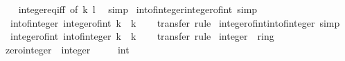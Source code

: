\begin{isabellebody}
%
\isadelimproof
\ \ %
\endisadelimproof
%
\isatagproof
{}\isamarkupfalse%
\ integer{\isacharunderscore}{\kern0pt}eq{\isacharunderscore}{\kern0pt}iff\ {\isacharbrackleft}{\kern0pt}of\ k\ l{\isacharbrackright}{\kern0pt}\ \isamarkupfalse%
\ simp%
\endisatagproof
{\isafoldproof}%
%
\isadelimproof
\isanewline
%
\endisadelimproof
\isanewline
{}\isamarkupfalse%
\ int{\isacharunderscore}{\kern0pt}of{\isacharunderscore}{\kern0pt}integer{\isacharunderscore}{\kern0pt}integer{\isacharunderscore}{\kern0pt}of{\isacharunderscore}{\kern0pt}int\ {\isacharbrackleft}{\kern0pt}simp{\isacharbrackright}{\kern0pt}{\isacharcolon}{\kern0pt}\isanewline
\ \ {\isachardoublequoteopen}int{\isacharunderscore}{\kern0pt}of{\isacharunderscore}{\kern0pt}integer\ {\isacharparenleft}{\kern0pt}integer{\isacharunderscore}{\kern0pt}of{\isacharunderscore}{\kern0pt}int\ k{\isacharparenright}{\kern0pt}\ {\isacharequal}{\kern0pt}\ k{\isachardoublequoteclose}\isanewline
%
\isadelimproof
\ \ %
\endisadelimproof
%
\isatagproof
{}\isamarkupfalse%
\ transfer\ rule%
\endisatagproof
{\isafoldproof}%
%
\isadelimproof
\isanewline
%
\endisadelimproof
\isanewline
{}\isamarkupfalse%
\ integer{\isacharunderscore}{\kern0pt}of{\isacharunderscore}{\kern0pt}int{\isacharunderscore}{\kern0pt}int{\isacharunderscore}{\kern0pt}of{\isacharunderscore}{\kern0pt}integer\ {\isacharbrackleft}{\kern0pt}simp{\isacharbrackright}{\kern0pt}{\isacharcolon}{\kern0pt}\isanewline
\ \ {\isachardoublequoteopen}integer{\isacharunderscore}{\kern0pt}of{\isacharunderscore}{\kern0pt}int\ {\isacharparenleft}{\kern0pt}int{\isacharunderscore}{\kern0pt}of{\isacharunderscore}{\kern0pt}integer\ k{\isacharparenright}{\kern0pt}\ {\isacharequal}{\kern0pt}\ k{\isachardoublequoteclose}\isanewline
%
\isadelimproof
\ \ %
\endisadelimproof
%
\isatagproof
{}\isamarkupfalse%
\ transfer\ rule%
\endisatagproof
{\isafoldproof}%
%
\isadelimproof
\isanewline
%
\endisadelimproof
\isanewline
{}\isamarkupfalse%
\ integer\ {\isacharcolon}{\kern0pt}{\isacharcolon}{\kern0pt}\ ring{\isacharunderscore}{\kern0pt}{}\isanewline
{}\isanewline
\isanewline
{}\isamarkupfalse%
\ zero{\isacharunderscore}{\kern0pt}integer\ {\isacharcolon}{\kern0pt}{\isacharcolon}{\kern0pt}\ integer\isanewline
\ \ \ {\isachardoublequoteopen}{}\ {\isacharcolon}{\kern0pt}{\isacharcolon}{\kern0pt}\ int{\isachardoublequoteclose}\isanewline
%
\isadelimproof
\ \ %
\endisadelimproof

\end{isabellebody}
